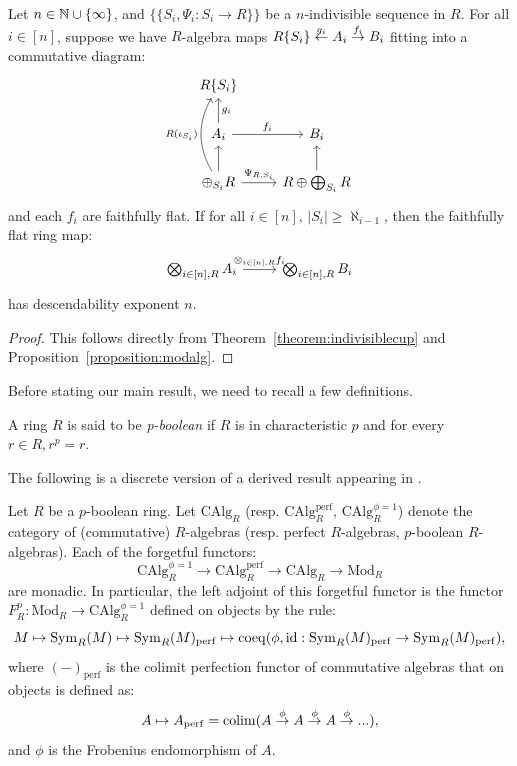 \begin{theorem}\label{theorem:indivalg}
Let $n \in \bb{N} \cup \{\infty\}$, and $\{\{S_i, \Psi_i:S_i \to R\}\}$ be a $n$-indivisible sequence in $R$. For all $i \in [n]$, suppose we have $R$-algebra maps $R\{S_i\} \over{g_i}{\leftarrow} A_i \over{f_i}{\to} B_i$ fitting into a commutative diagram:
\[\begin{tikzcd}
R\{S_i\}&\\
A_i \arrow[u, "g_i", swap] \arrow[r, "f_i"] & B_i \\
\oplus_{S_i} R \arrow[u] \arrow[uu, bend left, "R(\iota_{S_i})"] \arrow[r, "\Psi_{R,S_i}"] & R \oplus \bigoplus_{S_i} R \arrow[u]
\end{tikzcd}\]
and each $f_i$ are faithfully flat. If for all $i \in [n]$, $|S_i| \ge \aleph_{i-1}$, then the faithfully flat ring map:
\[\begin{tikzcd}\bigotimes_{i \in [n], R} A_i \arrow[r, "\otimes_{i \in [n],R} f_i"]& \bigotimes_{i \in [n],R} B_i\end{tikzcd}\]
has descendability exponent $n$.
\end{theorem}
\begin{proof}
This follows directly from Theorem~\ref{theorem:indivisiblecup} and Proposition~\ref{proposition:modalg}.
\end{proof}
Before stating our main result, we need to recall a few definitions.
\begin{definition}\label{definition:pboolean}
A ring $R$ is said to be \textit{p-boolean} if $R$ is in characteristic $p$ and for every $r \in R, r^p=r$.
\end{definition}
The following is a discrete version of a derived result appearing in \cite[Theorem 4.6]{pbool}.
\begin{theorem}\label{theorem:p-booleanmonadic}
Let $R$ be a $p$-boolean ring. Let $\mathrm{CAlg}_{R}$ (resp. $\mathrm{CAlg}^{\mathrm{perf}}_{R}$, $\mathrm{CAlg}^{\phi=1}_{R}$) denote the category of (commutative) $R$-algebras (resp. perfect $R$-algebras, $p$-boolean $R$-algebras). Each of the forgetful functors:
\[\mathrm{CAlg}^{\phi=1}_{R} \to \mathrm{CAlg}^{\mathrm{perf}}_{R} \to \mathrm{CAlg}_{R} \to \text{Mod}_R\]
are monadic. In particular, the left adjoint of this forgetful functor is the functor $F_R^p: \text{Mod}_R \to \mathrm{CAlg}^{\phi=1}_{R}$ defined on objects by the rule:
\[M \mapsto \Sym_R(M) \mapsto \Sym_R(M)_{\mathrm{perf}} \mapsto \coeq(\phi, \mathrm{id}: \Sym_R(M)_{\mathrm{perf}} \to \Sym_R(M)_{\mathrm{perf}}),\]
where $(-)_{\mathrm{perf}}$ is the colimit perfection functor of commutative algebras that on objects is defined as:
\[A \mapsto A_{\mathrm{perf}} = \colim(A \stackrel{\phi}{\to} A \stackrel{\phi}{\to} A \stackrel{\phi}{\to} ...),\]
and $\phi$ is the Frobenius endomorphism of $A$.
\end{theorem}

